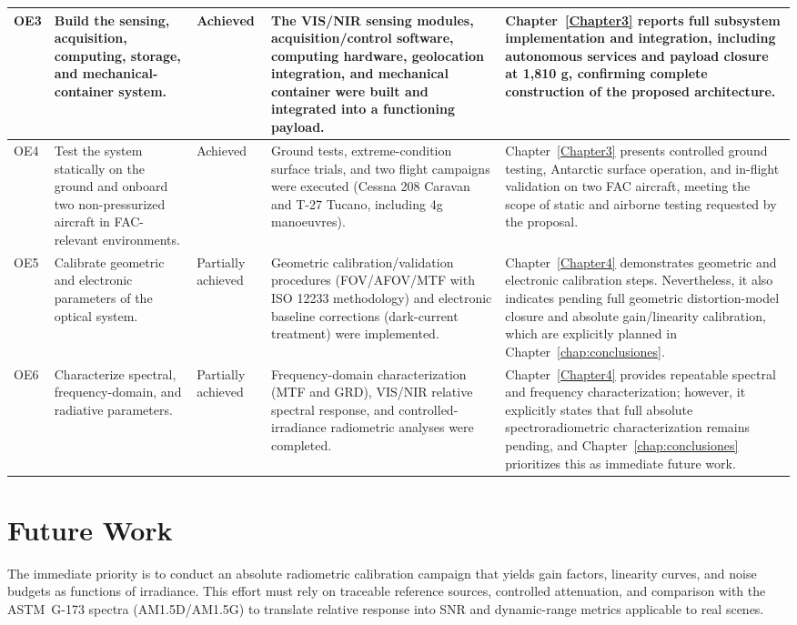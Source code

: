 \begin{longtable}{|p{}|p{}|p{}|p{}|p{}|}
OE3 & Build the sensing, acquisition, computing, storage, and mechanical-container system. & Achieved & The VIS/NIR sensing modules, acquisition/control software, computing hardware, geolocation integration, and mechanical container were built and integrated into a functioning payload. & Chapter~\ref{Chapter3} reports full subsystem implementation and integration, including autonomous services and payload closure at 1,810 g, confirming complete construction of the proposed architecture. \\ \hline
OE4 & Test the system statically on the ground and onboard two non-pressurized aircraft in FAC-relevant environments. & Achieved & Ground tests, extreme-condition surface trials, and two flight campaigns were executed (Cessna 208 Caravan and T-27 Tucano, including 4g manoeuvres). & Chapter~\ref{Chapter3} presents controlled ground testing, Antarctic surface operation, and in-flight validation on two FAC aircraft, meeting the scope of static and airborne testing requested by the proposal. \\ \hline
OE5 & Calibrate geometric and electronic parameters of the optical system. & Partially achieved & Geometric calibration/validation procedures (FOV/AFOV/MTF with ISO 12233 methodology) and electronic baseline corrections (dark-current treatment) were implemented. & Chapter~\ref{Chapter4} demonstrates geometric and electronic calibration steps. Nevertheless, it also indicates pending full geometric distortion-model closure and absolute gain/linearity calibration, which are explicitly planned in Chapter~\ref{chap:conclusiones}. \\ \hline
OE6 & Characterize spectral, frequency-domain, and radiative parameters. & Partially achieved & Frequency-domain characterization (MTF and GRD), VIS/NIR relative spectral response, and controlled-irradiance radiometric analyses were completed. & Chapter~\ref{Chapter4} provides repeatable spectral and frequency characterization; however, it explicitly states that full absolute spectroradiometric characterization remains pending, and Chapter~\ref{chap:conclusiones} prioritizes this as immediate future work. \\ \hline
\end{longtable}
\endgroup

\section{Future Work}

\noindent The immediate priority is to conduct an absolute radiometric calibration campaign that yields gain factors, linearity curves, and noise budgets as functions of irradiance. This effort must rely on traceable reference sources, controlled attenuation, and comparison with the ASTM~G-173 spectra (AM1.5D/AM1.5G) to translate relative response into SNR and dynamic-range metrics applicable to real scenes.\\

